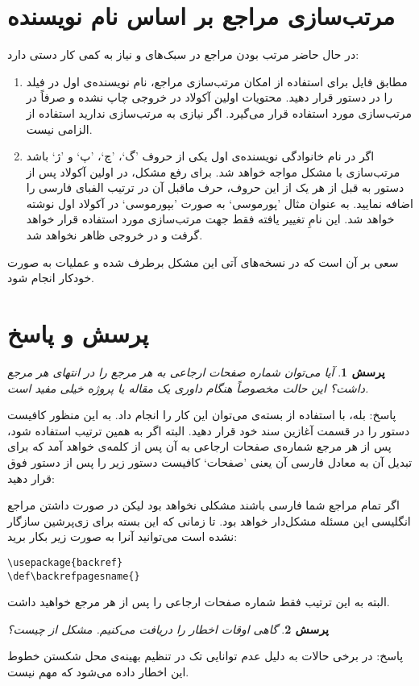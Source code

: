 \documentclass[11pt,a4paper]{article}
\theoremstyle{plain} \newtheorem{question}{پرسش}%
\newcommand{\answer}{{\noindent \Sayeh پاسخ: }}
\newcommand\SLASH{\char`\\}
\begin{document}
\section{مرتب‌سازی مراجع بر اساس نام نویسنده}
در حال حاضر مرتب بودن مراجع در سبک‌های  و  نیاز به کمی کار دستی دارد:
\begin{enumerate}
\item مطابق فایل  برای استفاده از امکان مرتب‌سازی مراجع، نام نویسنده‌ی اول در فیلد  را 
در دستور  قرار دهید. محتویات اولین آکولاد در خروجی چاپ نشده و 
صرفاً در مرتب‌سازی مورد استفاده قرار می‌گیرد. اگر نیازی به مرتب‌سازی ندارید استفاده از  الزامی نیست.
\item اگر در نام خانوادگی نویسنده‌ی اول یکی از حروف 'گ`، 'چ`، 'پ` و 'ژ` باشد مرتب‌سازی با مشکل مواجه خواهد شد. برای رفع مشکل، در اولین آکولاد پس 
از دستور  به قبل از هر یک از این حروف، حرف ماقبل آن در ترتیب الفبای فارسی را اضافه نمایید. به عنوان مثال 'پورموسی` به صورت 'بپورموسی`
 در آکولاد اول نوشته خواهد شد. این نامِ تغییر یافته فقط جهت مرتب‌سازی مورد استفاده قرار خواهد گرفت و در خروجی ظاهر نخواهد شد.
\end{enumerate}
سعی بر آن است که در نسخه‌های آتی این مشکل برطرف شده و عملیات به صورت خودکار انجام شود.
\section{پرسش و پاسخ} 
\begin{question} آیا می‌توان شماره صفحات ارجاعی به هر مرجع را در انتهای هر مرجع داشت؟ این حالت مخصوصاً هنگام‌ داوری یک مقاله یا پروژه 
خیلی مفید است.
\end{question}
\answer
بله، با استفاده از بسته‌ی  می‌توان این کار را انجام داد. به این منظور کافیست دستور  را در 
قسمت آغازین سند خود قرار دهید.
البته اگر به همین ترتیب استفاده شود، پس از هر مرجع شماره‌ی صفحات ارجاعی به آن پس از کلمه‌ی  خواهد آمد که برای تبدیل آن به معادل فارسی 
آن یعنی 'صفحات` کافیست دستور زیر را پس از دستور فوق قرار دهید:
\begin{roman}
\noindent{ \SLASH def\SLASH backrefpagesname\{\rl{صفحات}\}}
\end{roman}
 اگر تمام مراجع شما فارسی باشند مشکلی نخواهد بود لیکن در صورت
داشتن مراجع انگلیسی این مسئله مشکل‌دار خواهد بود. تا زمانی که این بسته برای زی‌پرشین سازگار نشده است می‌توانید آنرا به صورت زیر بکار برید:
\begin{roman}
\begin{verbatim}
\usepackage{backref}
\def\backrefpagesname{}
\end{verbatim}
\end{roman}
البته به این ترتیب فقط شماره صفحات ارجاعی را پس از هر مرجع خواهید داشت.
\begin{question} گاهی اوقات اخطار \lr{Underfull \SLASH hbox} را دریافت می‌کنیم. مشکل از چیست؟ \end{question}
\answer در برخی حالات به دلیل عدم توانایی تک در تنظیم بهینه‌ی محل شکستن خطوط این اخطار داده می‌شود که مهم نیست.
\end{document}
